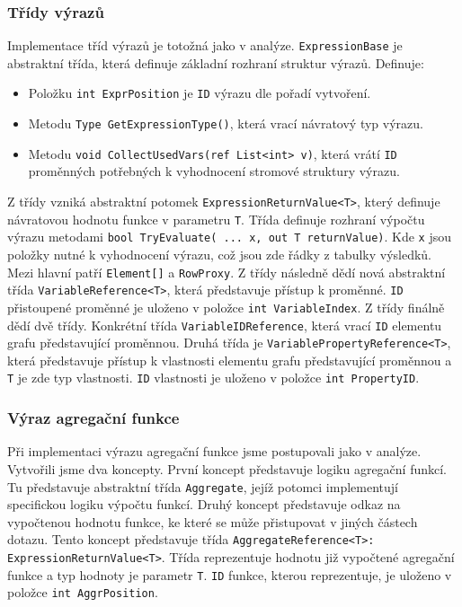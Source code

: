 \subsubsection{Třídy výrazů}

Implementace tříd výrazů je totožná jako v analýze.
\texttt{ExpressionBase} je abstraktní třída, která definuje základní rozhraní struktur výrazů.
Definuje:
\begin{itemize}
\item Položku \texttt{int ExprPosition} je \texttt{ID} výrazu dle pořadí vytvoření.
\item Metodu \texttt{Type GetExpressionType()}, která vrací návratový typ výrazu.
\item Metodu \texttt{void CollectUsedVars(ref List<int> v)}, která vrátí \texttt{ID} proměnných potřebných k vyhodnocení stromové struktury výrazu.
\end{itemize}
Z třídy vzniká abstraktní potomek \texttt{ExpressionReturnValue<T>}, který definuje návratovou hodnotu funkce v parametru \texttt{T}.
Třída definuje rozhraní výpočtu výrazu metodami \texttt{bool TryEvaluate( ... x, out T returnValue)}.
Kde \texttt{x} jsou položky nutné k vyhodnocení výrazu, což jsou zde řádky z tabulky výsledků.
Mezi hlavní patří \texttt{Element[]} a \texttt{RowProxy}.
Z třídy následně dědí nová abstraktní třída \texttt{VariableReference<T>}, která představuje přístup k proměnné.
\texttt{ID} přistoupené proměnné je uloženo v položce \texttt{int VariableIndex}.
Z třídy finálně dědí dvě třídy.
Konkrétní třída \texttt{VariableIDReference}, která vrací \texttt{ID} elementu grafu představující proměnnou.
Druhá třída je \texttt{VariablePropertyReference<T>}, která představuje přístup k vlastnosti elementu grafu představující proměnnou a \texttt{T} je zde typ vlastnosti.
\texttt{ID} vlastnosti je uloženo v položce \texttt{int PropertyID}. 

\subsubsection{Výraz agregační funkce}

Při implementaci výrazu agregační funkce jsme postupovali jako v analýze.
Vytvořili jsme dva koncepty.
První koncept představuje logiku agregační funkcí.
Tu představuje abstraktní třída \texttt{Aggregate}, jejíž potomci implementují specifickou logiku výpočtu funkcí. 
Druhý koncept představuje odkaz na vypočtenou hodnotu funkce, ke které se může přistupovat v jiných částech dotazu.
Tento koncept představuje třída \texttt{AggregateReference<T>: ExpressionReturnValue<T>}.
Třída reprezentuje hodnotu již vypočtené agregační funkce a typ hodnoty je parametr \texttt{T}.
\texttt{ID} funkce, kterou reprezentuje, je uloženo v položce \texttt{int AggrPosition}.

